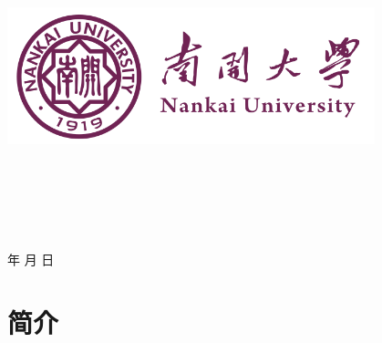 \documentclass[a4paper]{article}
\newcommand{\HRule}{\rule{\linewidth}{0.5mm}}%
\begin{document}
\renewcommand{\contentsname}{目\ 录}
\renewcommand{\appendixname}{附录}
\renewcommand{\appendixpagename}{附录}
\renewcommand{\refname}{参考文献} 
\renewcommand{\figurename}{图}
\renewcommand{\tablename}{表}
\renewcommand{\today}{\number\year 年 \number\month 月 \number\day 日}

\begin{titlepage}
    \begin{center}
    \includegraphics[width=0.8\textwidth]{NKU.png}\\[1cm]
    \vspace{20mm}
		\textbf{\huge\textbf{}}\\[0.5cm]
		\textbf{\huge{}}\\[2.3cm]
		\textbf{\Huge\textbf{}}

		\vspace{\fill}
    
    \centering
    \textsc{\LARGE {}}\\[0.5cm]
    \textsc{\LARGE {}}\\[0.5cm]
    \textsc{\LARGE {}}\\[0.5cm]
    
    \vfill
    {\Large \today}
    \end{center}
\end{titlepage}

\renewcommand {\thefigure}{\thesection{}.\arabic{figure}}%
\renewcommand{\figurename}{图}
\renewcommand{\contentsname}{目录}  


\clearpage
\tableofcontents
\newpage

\section{简介}
\end{document}
